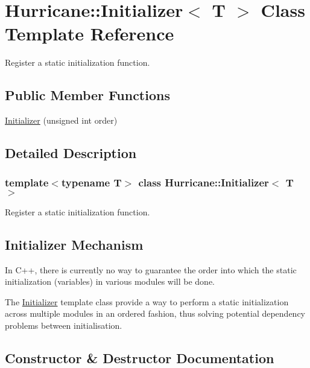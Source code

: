 \hypertarget{classHurricane_1_1Initializer}{}\section{Hurricane\+:\+:Initializer$<$ T $>$ Class Template Reference}
\label{classHurricane_1_1Initializer}


Register a static initialization function.  


\subsection*{Public Member Functions}
\begin{DoxyCompactItemize}
\item 
\hyperlink{classHurricane_1_1Initializer_ab80fdb7c17aaf5bd3facdf3f0f9d12ae}{Initializer} (unsigned int order)
\end{DoxyCompactItemize}


\subsection{Detailed Description}
\subsubsection*{template$<$typename T$>$\newline
class Hurricane\+::\+Initializer$<$ T $>$}

Register a static initialization function. 

\hypertarget{classHurricane_1_1Initializer_secInitializerMechanism}{}\subsection{Initializer Mechanism}\label{classHurricane_1_1Initializer_secInitializerMechanism}
In C++, there is currently no way to guarantee the order into which the static initialization (variables) in various modules will be done.

The \hyperlink{classHurricane_1_1Initializer}{Initializer} template class provide a way to perform a static initialization across multiple modules in an ordered fashion, thus solving potential dependency problems between initialisation. 

\subsection{Constructor \& Destructor Documentation}
\mbox{\label{classHurricane_1_1Initializer_ab80fdb7c17aaf5bd3facdf3f0f9d12ae}} 
